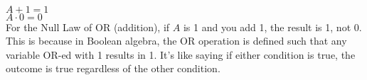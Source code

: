 \begin{ColorThemedBox}[1][2][title=Null Law]\relax
	\begin{Items}
		\smallskip\\

		$ A + 1 = 1 $\\
		 $ A \cdot 0 = 0 $\\

		 For the Null Law of OR (addition), if $A$ is 1 and you add 1, the result is 1, not 0.
		This is because in Boolean algebra, the OR operation is defined such that any variable OR-ed with 1 results in 1.
		It’s like saying if either condition is true, the outcome is true regardless of the other condition.\smallskip
	\end{Items}
\end{ColorThemedBox}
\smallskip\\
